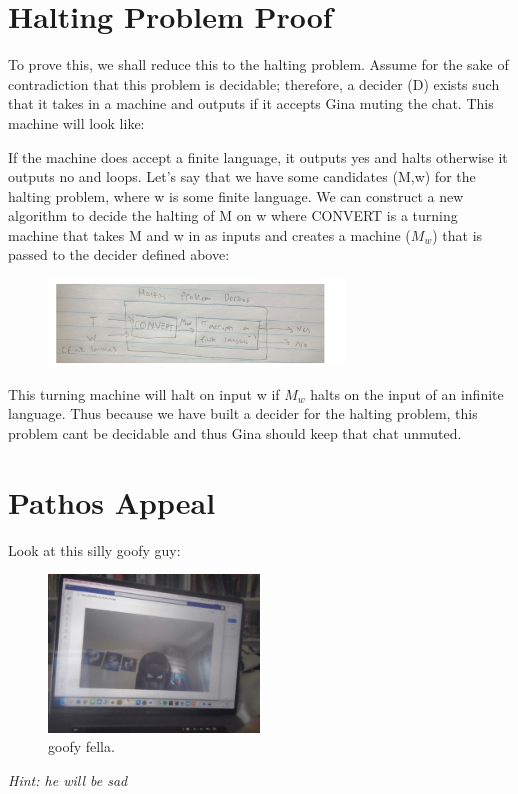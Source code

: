 \documentclass[12pt]{article}
\begin{document}
\section{Halting Problem Proof}

To prove this, we shall reduce this to the halting problem.
Assume for the sake of contradiction that this problem is decidable; therefore, a decider (D) exists such that it takes in a machine and outputs if it accepts Gina muting the chat. This machine will look like:

If the machine does accept a finite language, it outputs yes and halts otherwise it outputs no and loops. Let’s say that we have some candidates (M,w) for the halting problem, where w is some finite language.  We can construct a new algorithm to decide the halting of M on w where CONVERT is a turning machine that takes M and w in as inputs and creates a machine ($M_w$) that is passed to the decider defined above:

\begin{figure}[tbhp]
	\begin{center}
		\includegraphics[width=0.7\textwidth]{p2.png}
	\end{center}
\end{figure}

This turning machine will halt on input w if $M_w$ halts on the input of an infinite language. Thus because we have built a decider for the halting problem, this problem cant be decidable and thus Gina should keep that chat unmuted.

\section{Pathos Appeal}
\label{sec:image}

Look at this silly goofy guy:

\begin{figure}[tbhp]
	\begin{center}
		\includegraphics[width=0.5\textwidth]{p3.png}
	\end{center}
	\caption{goofy fella.}
	\label{figcaption}
\end{figure}

{\itshape Hint: he will be sad}
\end{document}
